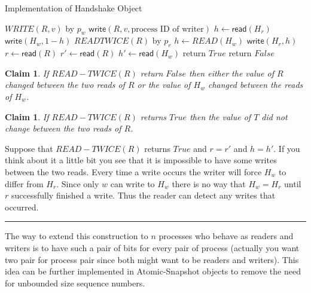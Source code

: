 \documentclass[twoside]{article}
\newtheorem{claim}[theorem]{Claim}
\newenvironment{proof}{{\bf Proof:}}{\hfill\rule{2mm}{2mm}}
\newcommand\readF{\mathsf{read}}
\newcommand\writeF{\mathsf{write}}
\begin{document}
\begin{algorithm}
	\caption{Implementation of Handshake Object}
    \label{pseudocode:handshake}
    \begin{algorithmic}[1]
	\State $WRITE(R, v)$ by $p_w$
	\State $\writeF(R, v, \mbox{process ID of writer})$
	\State $h \leftarrow \readF(H_r)$
	\State $\writeF(H_w, 1-h)$
	\State
	\State $READTWICE(R)$ by $p_r$
	\State $h \leftarrow READ(H_w)$
	\State $\writeF(H_r, h)$
	\State $r \leftarrow \readF(R)$
	\State $r' \leftarrow \readF(R)$
	\State $h' \leftarrow \readF(H_w)$
		\State return $True$
	\Else
		\State return $False$
	\EndIf		
	\end{algorithmic}
\end{algorithm}

\begin{claim}
If $READ-TWICE(R)$ return $False$ then either the value of $R$ changed between the two reads of $R$ or the value of $H_w$ changed between the reads of $H_w$.
\end{claim}

\begin{claim}
If $READ-TWICE(R)$ returns $True$ then the value of $T$ did not change between the two reads of $R$.
\end{claim}
\begin{proof}
Suppose that $READ-TWICE(R)$ returns $True$ and $r = r'$ and $h = h'$. If you think about it a little bit you see that it is impossible to have some writes between the two reads. Every time a write occurs the writer will force $H_w$ to differ from $H_r$. Since only $w$ can write to $H_w$ there is no way that $H_w = H_r$ until $r$ successfully finished a write. Thus the reader can detect any writes that occurred.  
\end{proof}

The way to extend this construction to $n$ processes who behave as readers and writers is to have such a pair of bits for every pair of process (actually you want two pair for process pair since both might want to be readers and writers). This idea can be further implemented in Atomic-Snapshot objects to remove the need for unbounded size sequence numbers. 
\end{document}
